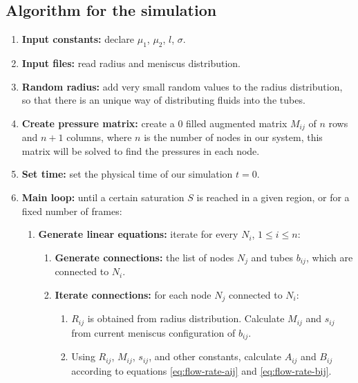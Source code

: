 \documentclass{crm-article}
\begin{document}
		\subsection{Algorithm for the simulation} \label{sec:detailed-algorithm}
			\begin{enumerate}
				\item \textbf{Input constants:} declare ${\mu}_{1}$, ${\mu}_{2}$, $l$, $\sigma$.
				
				\item \textbf{Input files:} read radius and meniscus distribution.
				
				\item \textbf{Random radius:} add very small random values to the radius distribution, so that there is an unique way of distributing fluids into the tubes.
				
				\item \textbf{Create pressure matrix:} create a 0 filled augmented matrix $M_{ij}$ of $n$ rows and $n + 1$ columns, where $n$ is the number of nodes in our system, this matrix will be solved to find the pressures in each node.
				
				\item \textbf{Set time:} set the physical time of our simulation $t = 0$.
				\item \textbf{Main loop:} until a certain saturation $S$ is reached in a given region, or for a fixed number of frames:
				\begin{enumerate}
					\item \textbf{Generate linear equations:} iterate for every $N_i$, $1 \le i \le n$:
					
					\begin{enumerate}
						\item \textbf{Generate connections:} the list of nodes $N_j$ and tubes $b_{ij}$, which are connected to $N_i$.
						
						\item \textbf{Iterate connections:} for each node $N_j$ connected to $N_i$:
						
						\begin{enumerate}
							\item $R_{ij}$ is obtained from radius distribution. Calculate $M_{ij}$ and $s_{ij}$ from current meniscus configuration of $b_{ij}$.
							
							\item Using $R_{ij}$, $M_{ij}$, $s_{ij}$, and other constants, calculate $A_{ij}$ and $B_{ij}$ according to equations \ref{eq:flow-rate-aij} and \ref{eq:flow-rate-bij}.
							

\end{enumerate}
\end{enumerate}
\end{enumerate}
\end{enumerate}
\end{document}
